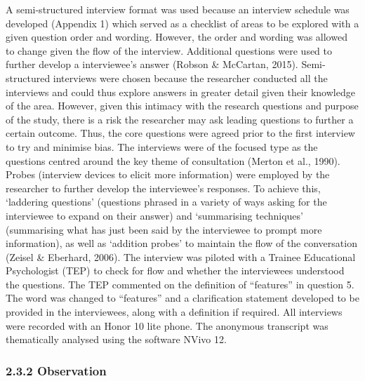 \documentclass[
  english,
  man]{apa7}
\begin{document}
A semi-structured interview format was used because an interview schedule was developed (Appendix 1) which served as a checklist of areas to be explored with a given question order and wording. However, the order and wording was allowed to change given the flow of the interview. Additional questions were used to further develop a interviewee's answer (Robson \& McCartan, 2015). Semi-structured interviews were chosen because the researcher conducted all the interviews and could thus explore answers in greater detail given their knowledge of the area. However, given this intimacy with the research questions and purpose of the study, there is a risk the researcher may ask leading questions to further a certain outcome. Thus, the core questions were agreed prior to the first interview to try and minimise bias. The interviews were of the focused type as the questions centred around the key theme of consultation (Merton et al., 1990). Probes (interview devices to elicit more information) were employed by the researcher to further develop the interviewee's responses. To achieve this, `laddering questions' (questions phrased in a variety of ways asking for the interviewee to expand on their answer) and `summarising techniques' (summarising what has just been said by the interviewee to prompt more information), as well as `addition probes' to maintain the flow of the conversation (Zeisel \& Eberhard, 2006). The interview was piloted with a Trainee Educational Psychologist (TEP) to check for flow and whether the interviewees understood the questions. The TEP commented on the definition of ``features'' in question 5. The word was changed to ``features'' and a clarification statement developed to be provided in the interviewees, along with a definition if required. All interviews were recorded with an Honor 10 lite phone. The anonymous transcript was thematically analysed using the software NVivo 12.

\hypertarget{observation}{%
\subsubsection{2.3.2 Observation}\label{observation}}
\end{document}
